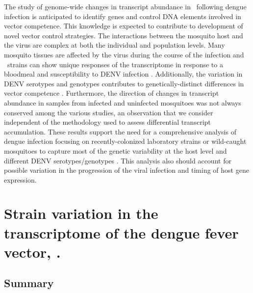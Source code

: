 The study of genome-wide changes in transcript abundance in \Aa\ following dengue infection is anticipated to identify genes and control DNA elements involved in vector competence.
This knowledge is expected to contribute to development of novel vector control strategies.
The interactions between the mosquito host and the virus are complex at both the individual and population levels.
Many mosquito tissues are affected by the virus during the course of the infection and \Aa\ strains can show unique responses of the transcriptome in response to a bloodmeal and susceptibility to \gls{DENV} infection \cite{Black2002,bonizzoni2012strain}.
Additionally, the variation in \gls{DENV} serotypes and genotypes contributes to genetically-distinct differences in vector competence \cite{Anderson2006,Weaver2009}.
Furthermore, the direction of changes in transcript abundance in samples from infected and uninfected mosquitoes was not always conserved among the various studies, an observation that we consider independent of the methodology used to assess differential transcript accumulation.
These results support the need for a comprehensive analysis of dengue infection focusing on recently-colonized laboratory strains or wild-caught mosquitoes to capture most of the genetic variability at the host level and different \gls{DENV} serotypes/genotypes \cite{Armstrong2001}.
This analysis also should account for possible variation in the progression of the viral infection and timing of host gene expression.



\pagebreak
\section{Strain variation in the transcriptome of the dengue fever vector, \Aea. \cite{bonizzoni2012strain}}


\subsection{Summary}


